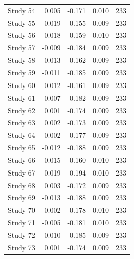 \begin{table}[!h]
{\begin{tabular}[t]{rrrrr}
\hspace{1em}Study 54 & 0.005 & -0.171 & 0.010 & 233\\
\hspace{1em}Study 55 & 0.019 & -0.155 & 0.009 & 233\\
\hspace{1em}Study 56 & 0.018 & -0.159 & 0.010 & 233\\
\hspace{1em}Study 57 & -0.009 & -0.184 & 0.009 & 233\\
\hspace{1em}Study 58 & 0.013 & -0.162 & 0.009 & 233\\
\hspace{1em}Study 59 & -0.011 & -0.185 & 0.009 & 233\\
\hspace{1em}Study 60 & 0.012 & -0.161 & 0.009 & 233\\
\hspace{1em}Study 61 & -0.007 & -0.182 & 0.009 & 233\\
\hspace{1em}Study 62 & 0.001 & -0.174 & 0.009 & 233\\
\hspace{1em}Study 63 & 0.002 & -0.173 & 0.009 & 233\\
\hspace{1em}Study 64 & -0.002 & -0.177 & 0.009 & 233\\
\hspace{1em}Study 65 & -0.012 & -0.188 & 0.009 & 233\\
\hspace{1em}Study 66 & 0.015 & -0.160 & 0.010 & 233\\
\hspace{1em}Study 67 & -0.019 & -0.194 & 0.010 & 233\\
\hspace{1em}Study 68 & 0.003 & -0.172 & 0.009 & 233\\
\hspace{1em}Study 69 & -0.013 & -0.188 & 0.009 & 233\\
\hspace{1em}Study 70 & -0.002 & -0.178 & 0.010 & 233\\
\hspace{1em}Study 71 & -0.005 & -0.181 & 0.010 & 233\\
\hspace{1em}Study 72 & -0.010 & -0.185 & 0.009 & 233\\
\hspace{1em}Study 73 & 0.001 & -0.174 & 0.009 & 233\\

\end{tabular}}
\end{table}

